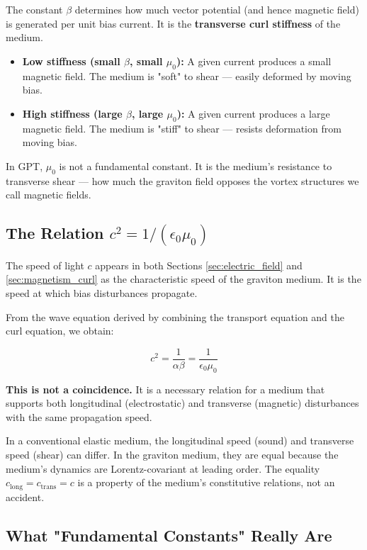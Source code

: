 \documentclass[12pt, a4paper]{article}
\begin{document}
The constant \( \beta \) determines how much vector potential (and hence magnetic field) is generated per unit bias current. It is the \textbf{transverse curl stiffness} of the medium.

\begin{itemize}
    \item \textbf{Low stiffness (small \( \beta \), small \( \mu_0 \)):} A given current produces a small magnetic field. The medium is "soft" to shear — easily deformed by moving bias.
    \item \textbf{High stiffness (large \( \beta \), large \( \mu_0 \)):} A given current produces a large magnetic field. The medium is "stiff" to shear — resists deformation from moving bias.
\end{itemize}

In GPT, \( \mu_0 \) is not a fundamental constant. It is the medium's resistance to transverse shear — how much the graviton field opposes the vortex structures we call magnetic fields.

\subsection{The Relation \( c^2 = 1/(\epsilon_0 \mu_0) \)}
\label{subsec:c_relation}

The speed of light \( c \) appears in both Sections \ref{sec:electric_field} and \ref{sec:magnetism_curl} as the characteristic speed of the graviton medium. It is the speed at which bias disturbances propagate.

From the wave equation derived by combining the transport equation and the curl equation, we obtain:

\[
c^2 = \frac{1}{\alpha \beta} = \frac{1}{\epsilon_0 \mu_0}
\]

\textbf{This is not a coincidence.} It is a necessary relation for a medium that supports both longitudinal (electrostatic) and transverse (magnetic) disturbances with the same propagation speed.

In a conventional elastic medium, the longitudinal speed (sound) and transverse speed (shear) can differ. In the graviton medium, they are equal because the medium's dynamics are Lorentz-covariant at leading order. The equality \( c_{\text{long}} = c_{\text{trans}} = c \) is a property of the medium's constitutive relations, not an accident.

\subsection{What "Fundamental Constants" Really Are}
\label{subsec:fundamental_constants}
\end{document}
